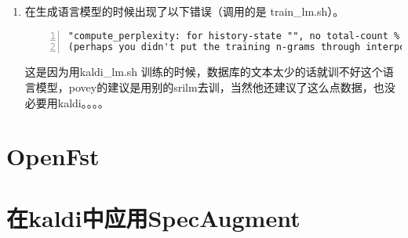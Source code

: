 \begin{enumerate}
\begin{lstlisting}
[ Stack-Trace: ]
kaldi::MessageLogger::LogMessage() const
kaldi::MessageLogger::LogAndThrow::operator=(kaldi::MessageLogger const&)
fst::ReadFstKaldi(std::string)
main
__libc_start_main
fstpushspecial() [0x401b99]
  \end{lstlisting}
  那么我们怎么来使用大的语言模型呢？可以先用小的语言模型参与解码，然后生成对应的lattice，再使用rescoring的方法利用大的语言模型来进行重新估计，解决步骤如下：
  \begin{enumerate}
      \item 使用 \textcolor{green}{utils/format\_lm.sh} 生成小语言模型的G.fst；
      \item 使用 \textcolor{green}{utils/format\_lm.sh} 生成大语言模型的G.fst；
      \item 使用 \textcolor{green}{utils/mkgraph.sh} 来逐步构图，生成HCLG.fst；
      \item 使用 \textcolor{green}{steps/online/nnet3/prepare\_online\_decoding.sh}来准备在线解码；
      \item 使用 \textcolor{green}{steps/online/nnet3/decode.sh}来进行在线解码生成lattice；
      \item 使用 \textcolor{green}{steps/lmrescore.sh} 来进行rescoring。切记{\bf 如果是chain model，在运行这条指令时要加上 "--self-loop-scale 1.0"}。
  \end{enumerate}
\item 在生成语言模型的时候出现了以下错误（调用的是 train\_lm.sh）。
  \begin{lstlisting}[language=shell, numbers=left, 
         numberstyle=\tiny,keywordstyle=\color{blue!70},
         commentstyle=\color{red!50!green!50!blue!50},frame=shadowbox,
         rulesepcolor=\color{red!20!green!20!blue!20},basicstyle=\ttfamily]
"compute_perplexity: for history-state "", no total-count % is seen
(perhaps you didn't put the training n-grams through interpolate_ngrams?)"
  \end{lstlisting}
  这是因为用kaldi\_lm.sh 训练的时候，数据库的文本太少的话就训不好这个语言模型，povey的建议是用别的srilm去训，当然他还建议了这么点数据，也没必要用kaldi。。。。
\end{enumerate}

\section{OpenFst}


\section{在kaldi中应用SpecAugment}
